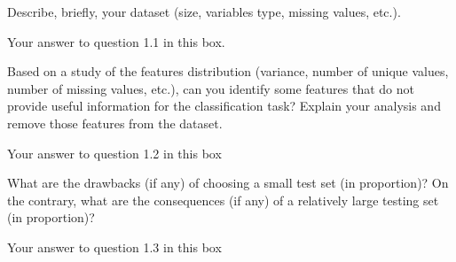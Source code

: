 
\begin{question}{1.1}
Describe, briefly, your dataset (size, variables type, missing values, etc.).
\end{question}
\begin{answer}{3} 
    Your answer to question 1.1 in this box.
\end{answer}


\begin{question}{1.2}
Based on a study of the features distribution (variance, number of unique values, number of missing values, etc.), can you identify some features that do not provide useful information for the classification task? Explain your analysis and remove those features from the dataset. 
\end{question}
\begin{answer}{10} 
    Your answer to question 1.2 in this box
\end{answer}



\begin{question}{1.3}
What are the drawbacks (if any) of choosing a small test set (in proportion)? On the contrary, what are the consequences (if any) of a relatively large testing set (in proportion)?
\end{question}

\begin{answer}{6} 
    Your answer to question 1.3 in this box
\end{answer}
